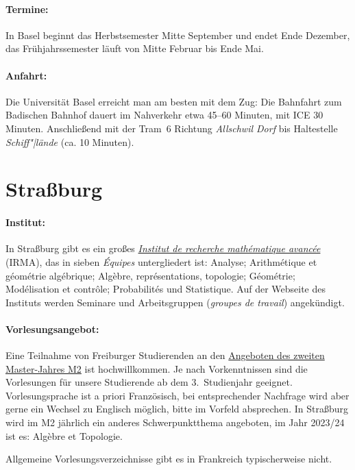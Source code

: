 \documentclass[a4paper,10pt]{article}
\begin{document}
\paragraph{Termine:} In Basel beginnt das Herbstsemester Mitte September und endet Ende Dezember,
das Frühjahrssemester läuft von Mitte Februar bis Ende Mai.

\paragraph{Anfahrt:} Die Universität Basel erreicht man am besten mit dem Zug: 
Die Bahnfahrt zum Badischen Bahnhof dauert im Nahverkehr etwa 45--60 Minuten, mit ICE 30 Minuten.
Anschließend mit der Tram~6 Richtung \emph{Allschwil Dorf} bis Haltestelle \emph{Schiff"|lände} (ca. 10 Minuten).


\section*{Straßburg}

\paragraph{Institut:} In Straßburg gibt es ein großes 
\href{https://irma.math.unistra.fr}{\emph{Institut de recherche mathématique avancée}} (IRMA), 
das in sieben \emph{\'Equipes} untergliedert ist:
Analyse; Arithmétique et géométrie algébrique; Algèbre, représentations, topologie; Géométrie; 
Modélisation et contrôle; Probabilités und Statistique.
Auf der Webseite des Instituts werden Seminare und Arbeitsgruppen (\emph{groupes de travail}) angekündigt.

\paragraph{Vorlesungsangebot:}
Eine Teilnahme von Freiburger Studierenden an den
\href{https://irma.math.unistra.fr/linstitut/lmd_enseignement.html#masters}{Angeboten des zweiten Master-Jahres M2} ist hochwillkommen. 
Je nach Vorkenntnissen sind die Vorlesungen für unsere Studierende ab dem 3.~Studienjahr geeignet.
Vorlesungsprache ist a priori Französisch, bei entsprechender Nachfrage wird aber gerne ein Wechsel zu Englisch möglich, bitte im Vorfeld absprechen. 
In Straßburg wird im M2 jährlich ein anderes Schwerpunktthema angeboten, im Jahr 2023/24 ist es:
{Alg\`ebre et Topologie}.

Allgemeine Vorlesungsverzeichnisse gibt es in Frankreich typischerweise nicht.
\end{document}
